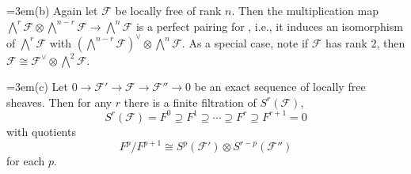 {\noindent\hangindent=3em\hspace*{1.7em}(b) Again let $\mathcal F$ be locally free of rank $n$. Then the multiplication map $\bigwedge^r\mathcal F\otimes\bigwedge^{n-r}\mathcal F\to\bigwedge^n\mathcal F$ is a perfect pairing for , i.e., it induces an isomorphism of $\bigwedge^r\mathcal F$ with $(\bigwedge^{n-r}\mathcal F)^\vee\otimes\bigwedge^n\mathcal F$. As a special case, note if $\mathcal F$ has rank $2$, then $\mathcal F\cong\mathcal F^\vee\otimes\bigwedge^2\mathcal F$.

\noindent\hangindent=3em\hspace*{1.7em}(c) Let $0\to\mathcal F'\to\mathcal F\to\mathcal F''\to0$ be an exact sequence of locally free sheaves. Then for any $r$ there is a finite filtration of $S^r(\mathcal F)$,
\[
S^r(\mathcal F)=F^0\supseteq F^1\supseteq\cdots\supseteq F^r\supseteq F^{r+1}=0
\]
with quotients
\[
F^p/F^{p+1}\cong S^p(\mathcal F')\otimes S^{r-p}(\mathcal F'')
\]
for each $p$.}
